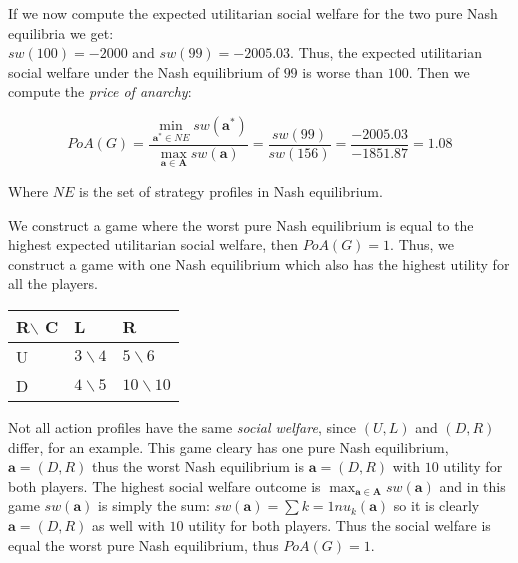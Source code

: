 \documentclass[12pt]{article}
\newenvironment{answer}[2][Answer]{\begin{trivlist}
\item[\hskip \labelsep {\bfseries #1}\hskip \labelsep {\bfseries #2:}]}{\end{trivlist}}
\begin{document}
\begin{answer}{a)}
If we now compute the expected utilitarian social welfare for the two pure Nash equilibria we get: \\
$sw(100)=-2000$ and $sw(99)=-2005.03$. Thus, the expected utilitarian social welfare under the Nash equilibrium of $99$ is worse than $100$. Then we compute the \textit{price of anarchy}:

$$PoA(G)=\frac{\min_{\boldsymbol{a}^* \in NE }sw(\boldsymbol{a}^*)}{\max_{\boldsymbol{a} \in \boldsymbol{A}}sw(\boldsymbol{a})}=\frac{sw(99)}{sw(156)}=\frac{-2005.03}{-1851.87}=1.08$$

Where $NE$ is the set of strategy profiles in Nash equilibrium.
\end{answer}
\begin{answer}{b)}
We construct a game where the worst pure Nash equilibrium is equal to the highest expected utilitarian social welfare, then $PoA(G)=1$. Thus, we construct a game with one Nash equilibrium which also has the highest utility for all the players.

\begin{table}[h]
    \begin{tabular}{|l|l|l|}
    \hline
    R$\backslash$ C & L            & R              \\ \hline
    U & $3\backslash 4$ & $5\backslash 6$   \\ \hline
    D & $4\backslash 5$ & $10\backslash 10$ \\ \hline
    \end{tabular}
\end{table}

Not all action profiles have the same \textit{social welfare}, since $(U,L)$ and $(D,R)$ differ, for an example.
This game cleary has one pure Nash equilibrium, $\boldsymbol{a}=(D,R)$ thus the worst Nash equilibrium is $\boldsymbol{a}=(D,R)$ with $10$ utility for both players. The highest social welfare outcome is $\max_{\boldsymbol{a} \in \boldsymbol{A}}sw(\boldsymbol{a})$ and in this game $sw(\boldsymbol{a})$ is simply the sum: $sw(\boldsymbol{a})=\sum{k=1}{n}{u_k(\boldsymbol{a})}$ so it is clearly $\boldsymbol{a}=(D,R)$ as well with $10$ utility for both players. Thus the social welfare is equal the worst pure Nash equilibrium, thus $PoA(G)=1$.

\end{answer}
\end{document}
